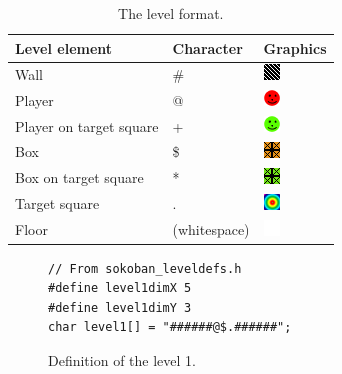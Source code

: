 \documentclass[a4paper,11pt]{article}
\begin{document}
\begin{table}[H]
\centering
\begin{tabular}{|l|l|l|}
\hline \textbf{Level element} & \textbf{Character} & \textbf{Graphics} \\ 
\hline Wall & \# & \includegraphics[scale=0.6]{images/wall.png} \\ 
\hline Player & @ & \includegraphics[scale=0.6]{images/player.png} \\ 
\hline Player on target square & + & \includegraphics[scale=0.6]{images/playertarget.png} \\ 
\hline Box & \$ & \includegraphics[scale=0.6]{images/crate.png}\\ 
\hline Box on target square & * & \includegraphics[scale=0.6]{images/cratetarget.png}\\ 
\hline Target square & . & \includegraphics[scale=0.6]{images/target.png}\\ 
\hline Floor & (whitespace) & \includegraphics[scale=0.6]{images/blank.png} \\ 
\hline 
\end{tabular}
\caption{The level format.}
\label{tab:levelformat}
\end{table}

\begin{figure}[H]
\begin{lstlisting}
// From sokoban_leveldefs.h
#define level1dimX 5
#define level1dimY 3
char level1[] = "######@$.######";
\end{lstlisting}
\caption{Definition of the level 1.}
\label{fig:leveldef}
\end{figure}
\end{document}
